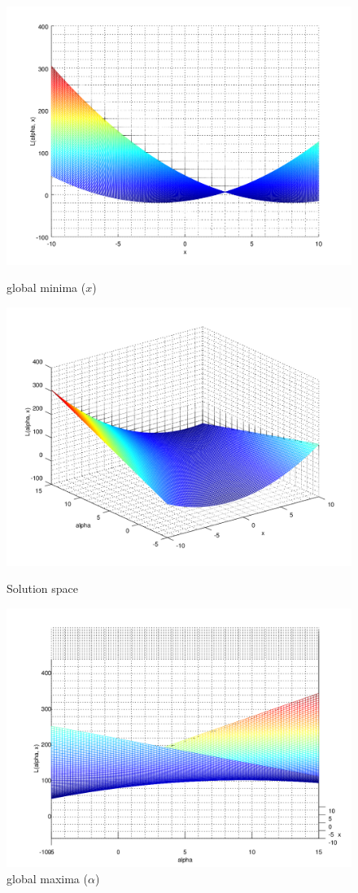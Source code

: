 \documentclass{article}
\begin{document}
\begin{figure}[!htb]
  \includegraphics[width=\linewidth]{L_x.png}
  \caption{global minima ($x$)}\label{fig:awesome_image1}
\endminipage\hfill
{}
  \includegraphics[width=\linewidth]{surface.png}
  \caption{Solution space}\label{fig:awesome_image2}
\endminipage\hfill
{}%
  \includegraphics[width=\linewidth]{L_alpha.png}
  \caption{global maxima ($\alpha$) }\label{fig:awesome_image3}
\endminipage
\end{figure}
\end{document}
